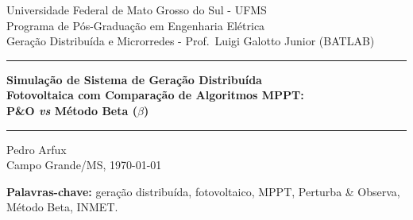 \documentclass[11pt,a4paper]{article}
\begin{document}
\begin{center}
  {\small Universidade Federal de Mato Grosso do Sul - UFMS}\\
  {\small Programa de Pós-Graduação em Engenharia Elétrica}\\
  {\small Geração Distribuída e Microrredes - Prof.\ Luigi Galotto Junior (BATLAB)}
  \vspace{0.8em}
  \hrule
  \vspace{0.8em}
  {\LARGE\bfseries Simulação de Sistema de Geração Distribuída\\[4pt]
   Fotovoltaica com Comparação de Algoritmos MPPT:\\[4pt]
   P\&O \textit{vs} Método Beta ($\beta$)}
  \vspace{0.5em}
  \hrule
  \vspace{0.5em}
  {\normalsize Pedro Arfux}\\[2pt]
  {\small Campo Grande/MS, \today}
\end{center}

\begin{abstract}
\noindent
Este trabalho apresenta a simulação de um sistema de geração distribuída fotovoltaica
(GD-FV) de \SI{200}{\watt-peak} integrado a um banco de baterias ideal de
\SI{48}{\volt}/\SI{100}{\ampere\hour}, alimentado por dados climáticos reais da
Estação Automática INMET~A702 (Campo~Grande/MS, período de sete dias - março de 2025).
Dois algoritmos de rastreamento do ponto de máxima potência (MPPT) são implementados
e comparados: \textit{Perturba \& Observa} (P\&O) e o \textit{Método Beta} ($\beta$).
A simulação utiliza o modelo de diodo único para o painel FV, resolvido iterativamente
via Newton-Raphson, e um conversor Buck-Boost operando em modo de controle de corrente.
Os resultados mostram que o Método~Beta atinge Fator de Rastreamento (FR) de \SI{99,98}{\percent}
e energia total de \SI{6,96}{\kilo\watt\hour} em sete dias, superando o P\&O em
\SI{5}{\percent} (FR~=~\SI{95,0}{\percent}, \SI{6,62}{\kilo\watt\hour}).
A diferença é explicada pela característica oscilatória intrínseca do P\&O, que o Beta
elimina por meio do controlador PI adaptativo.
\end{abstract}

\vspace{-0.5em}
\noindent\textbf{Palavras-chave:} geração distribuída, fotovoltaico, MPPT, Perturba \& Observa, Método Beta, INMET.

\vspace{1em}
\end{document}
